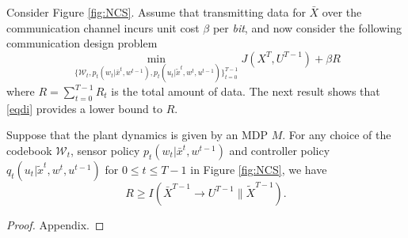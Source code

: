 Consider Figure \ref{fig:NCS}. Assume that transmitting data for $\bar{X}$ over the communication channel incurs unit cost $\beta$ per \emph{bit}, and now consider the following communication design problem
\begin{equation}
\min_{\{\mathcal{W}_t, p_t(w_t|\bar{x}^t, w^{t-1}), p_t(u_t|\tilde{x}^t, w^t, u^{t-1}) \}_{t=0}^{T-1}}  J(X^T, U^{T-1}) +\beta R \label{eqcommproblem}
\end{equation}
where $R=\sum_{t=0}^{T-1}R_t$ is the total amount of data. 
The next result shows that \eqref{eqdi} provides a lower bound to $R$.
\begin{theorem}
	Suppose that the plant dynamics is given by an MDP $M$. For any choice of the codebook $\mathcal{W}_t$, sensor policy $p_t(w_t|\bar{x}^t, w^{t-1})$ and controller policy $q_t(u_t|\tilde{x}^t, w^t, u^{t-1})$ for $0\leq t\leq T-1$ in Figure \ref{fig:NCS}, we have
	\[
	R \geq I(\bar{X}^{T-1}\rightarrow U^{T-1}\| \tilde{X}^{T-1}).
	\]
\end{theorem}
\begin{proof}
	Appendix.
\end{proof}

